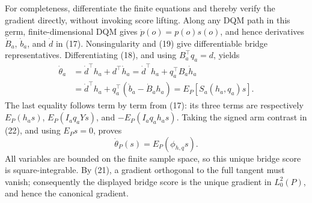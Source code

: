 For completeness, differentiate the finite equations and thereby verify the gradient directly, without invoking score lifting.  Along any DQM path in this germ, finite-dimensional DQM gives
\(\dot p(o)=p(o)s(o)\), and hence derivatives \(\dot B_a\), \(\dot b_a\), and \(\dot d\) in (17).  Nonsingularity and (19) give differentiable bridge representatives.  Differentiating (18), and using \(B_a^\top q_a=d\), yields
\[
 \begin{aligned}
 \dot\theta_a
 &=\dot d^\top h_a+d^\top\dot h_a
 =\dot d^\top h_a+q_a^\top B_a\dot h_a\\
 &=\dot d^\top h_a+q_a^\top(\dot b_a-\dot B_ah_a)
 =E_P[S_a(h_a,q_a)s].                                               \tag{22}
 \end{aligned}
\]
The last equality follows term by term from (17): its three terms are respectively \(E_P(h_as)\), \(E_P(I_aq_aYs)\), and \(-E_P(I_aq_ah_as)\).  Taking the signed arm contrast in (22), and using \(E_Ps=0\), proves
\[
 \dot\theta_P(s)=E_P(\phi_{h,q}s).
\]
All variables are bounded on the finite sample space, so this unique bridge score is square-integrable.  By (21), a gradient orthogonal to the full tangent must vanish; consequently the displayed bridge score is the unique gradient in \(L_0^2(P)\), and hence the canonical gradient.
